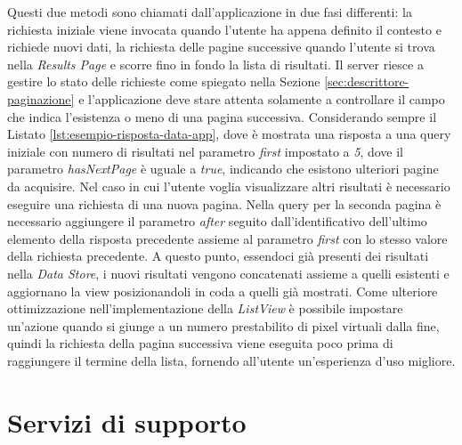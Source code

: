 Questi due metodi sono chiamati dall'applicazione in due fasi differenti: la richiesta iniziale viene invocata quando l'utente ha appena definito il contesto e richiede nuovi dati, la richiesta delle pagine successive quando l'utente si trova nella \emph{Results Page} e scorre fino in fondo la lista di risultati. 
Il server riesce a gestire lo stato delle richieste come spiegato nella Sezione \ref{sec:descrittore-paginazione} e l'applicazione deve stare attenta solamente a controllare il campo che indica l'esistenza o meno di una pagina successiva.
Considerando sempre il Listato \ref{lst:esempio-risposta-data-app}, dove è mostrata una risposta a una query iniziale con numero di risultati nel parametro \emph{first} impostato a \emph{5}, dove il parametro \emph{hasNextPage} è uguale a \emph{true}, indicando che esistono ulteriori pagine da acquisire. Nel caso in cui l'utente voglia visualizzare altri risultati è necessario eseguire una richiesta di una nuova pagina. Nella query per la seconda pagina è necessario aggiungere il parametro \emph{after} seguito dall'identificativo dell'ultimo elemento della risposta precedente assieme al parametro \emph{first} con lo stesso valore della richiesta precedente. A questo punto, essendoci già presenti dei risultati nella \emph{Data Store}, i nuovi risultati vengono concatenati assieme a quelli esistenti e aggiornano la view posizionandoli in coda a quelli già mostrati. Come ulteriore ottimizzazione nell'implementazione della \emph{ListView} è possibile impostare un'azione quando si giunge a un numero prestabilito di pixel virtuali dalla fine, quindi la richiesta della pagina successiva viene eseguita poco prima di raggiungere il termine della lista, fornendo all'utente un'esperienza d'uso migliore.

\section{Servizi di supporto}\label{sec:servizi-supporto-app}

